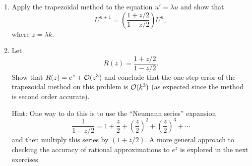 

\begin{enumerate}
\item Apply the trapezoidal method to the equation $u' = \lambda u$ and show
that
\[
U^{n+1} = \left( \frac{1 + z/2}{1 - z/2} \right) U^n,
\]
where $z = \lambda k$.

\item Let 
\[
R(z) = \frac{1 + z/2}{1 - z/2}.
\]
Show that $R(z) = e^z + {\mathcal O}(z^3)$ and conclude that the one-step error of
the trapezoidal method on this problem is ${\mathcal O}(k^3)$ (as expected since
the method is second order accurate).

Hint: One way to do this is to use the ``Neumann series'' expansion
\[
\frac{1}{1-z/2} = 1 + \frac z 2 + \left(\frac z 2\right)^2 + \left(\frac z
2\right)^3 + \cdots
\]
and then multiply this series by $(1 + z/2)$.
A more general approach to checking the accuracy of rational approximations
to $e^z$ is explored in the next exercises.

\end{enumerate}

